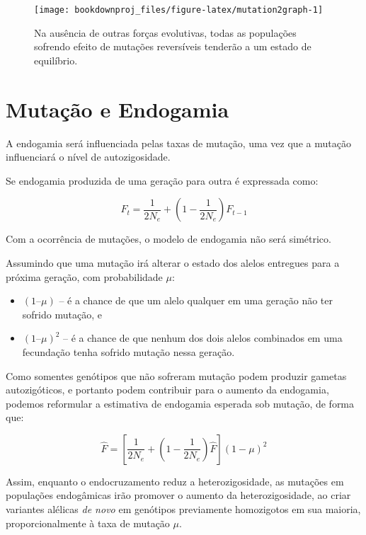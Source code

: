 \documentclass[
]{book}
\begin{document}
\begin{figure}

{\centering \texttt{[image: bookdownproj\_files/figure-latex/mutation2graph-1]} 

}

\caption{Na ausência de outras forças evolutivas, todas as populações sofrendo efeito de mutações reversíveis tenderão a um estado de equilíbrio.}\label{fig:mutation2graph}
\end{figure}

\hypertarget{mutauxe7uxe3o-e-endogamia}{%
\section{Mutação e Endogamia}\label{mutauxe7uxe3o-e-endogamia}}

A endogamia será influenciada pelas taxas de mutação, uma vez que a mutação influenciará o nível de autozigosidade.

Se endogamia produzida de uma geração para outra é expressada como:

\[F_t = \frac{1}{2N_e} + \left( 1- \frac{1}{2N_e} \right)F_{t-1}\]

Com a ocorrência de mutações, o modelo de endogamia não será simétrico.

Assumindo que uma mutação irá alterar o estado dos alelos entregues para a próxima geração, com probabilidade \(\mu\):

\begin{itemize}
\item
  \((1 – \mu)\) -- é a chance de que um alelo qualquer em uma geração não ter sofrido mutação, e
\item
  \((1 – \mu)^2\) -- é a chance de que nenhum dos dois alelos combinados em uma fecundação tenha sofrido mutação nessa geração.
\end{itemize}

Como somentes genótipos que não sofreram mutação podem produzir gametas autozigóticos, e portanto podem contribuir para o aumento da endogamia, podemos reformular a estimativa de endogamia esperada sob mutação, de forma que:

\[\hat{F} = \left[ \frac{1}{2N_e} + \left( 1- \frac{1}{2N_e} \right)\hat{F} \right] \left( 1-\mu \right)^2\]

Assim, enquanto o endocruzamento reduz a heterozigosidade, as mutações em populações endogâmicas irão promover o aumento da heterozigosidade, ao criar variantes alélicas \emph{de novo} em genótipos previamente homozigotos em sua maioria, proporcionalmente à taxa de mutação \(\mu\).
\end{document}
